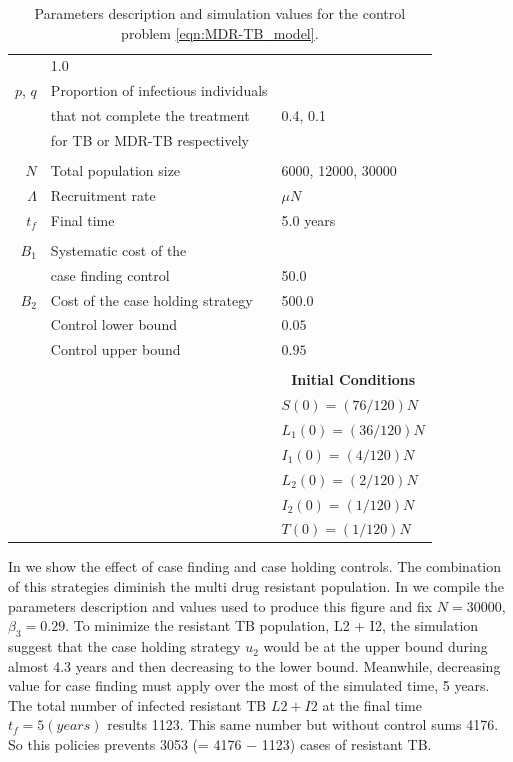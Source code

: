 \begin{table}[b]
\begin{tabular}{rll}
			& \num{1.0}
     	    \\
     	    $p$, $q$
     	    & Proportion of infectious individuals 
     	    \\
     	    & that not complete the treatment  
     	    & \num{0.4}, \num{0.1}
     	    \\
     	    & for TB or MDR-TB respectively
		\\
		\\	
			$N$ 
			& Total population size
			& 
			\num{6000}, 
			\num{12000}, 
			\num{30000}
            \\
			$\Lambda$ 
				& Recruitment rate
				& $\mu N$
            \\
            $t_f$ 
            & Final time 
            & \num{5.0} years
      \\
      \\
     	    $B_1$ 
     	    & Systematic cost of the 
     	    \\
     	    & case finding  control
     	    & \num{50.0}
			\\
     	    $B_2$
     	    & 
     	    Cost of the case holding strategy
     	    & \num{500.0}
     	    \\
     	    & Control lower bound  & $0.05$
			\\
          & Control upper bound & $0.95$
       		\\
       		\\
		&&\multicolumn{1}{c}{\textbf{Initial Conditions}}
		\\
		\cmidrule{3-3}
		&&	
		$S(0) = (76/120)N$
		\\
		&&
		$L_1(0) = (36/120) N$
		\\
		&&
		$I_1(0) = (4/120)N$
		\\
		&&
		$L_2(0) =(2/120) N$
		\\
		&&
		$I_2(0) = (1/120)N$
		\\
		&&
		$T(0)= (1/120)N$
		\\
		\bottomrule
    \end{tabular}
	\caption{Parameters description and simulation values for the control 
	problem \eqref{eqn:MDR-TB_model}.}
	\label{tbl:parameters_MDR-TB_model}
\end{table}


	In  we show the effect of case finding and 
case holding controls. The combination of this strategies diminish the multi 
drug resistant population. In  we compile the 
parameters description and values used to produce this figure and fix 
$N = \num{30000}$, $\beta_3 = \num{0.29}$. To minimize the resistant TB 
population, L2 + I2, the simulation suggest that the case holding strategy 
$u_2$ would be at the upper bound during almost \num{4.3} years and then 
decreasing to the lower bound. Meanwhile, decreasing value for case finding
must apply over the most of the simulated time, 5 years. The total number of 
infected resistant TB $L2 + I2$  at the final time $t_f = 5(years)$ results
\num{1123}. This same number but without control sums 4176. So this policies 
prevents  \num{3053} (= 4176 − 1123) cases of resistant TB.


